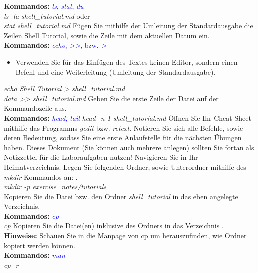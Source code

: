 \documentclass[paper=a4,fontsize=11pt]{scrartcl}%
\numberwithin{equation}{section}
\begin{document}
{\begin{enumerate}
\begin{tasks}
		\textbf{Kommandos:} \textcolor{blue}{\emph{ls}, \emph{stat}, \emph{du}}\\
		\textit{ls -la shell\_tutorial.md} oder\\
		\textit{stat shell\_tutorial.md}
		\task Fügen Sie mithilfe der Umleitung der Standardausgabe die Zeilen \glqq Shell Tutorial\grqq, sowie die Zeile mit dem aktuellen Datum ein.\\
		\textbf{Kommandos:} \textcolor{blue}{\emph{echo}, \emph{>>}, bzw. \emph{>}}\\
		\begin{itemize}
			\item \small Verwenden Sie für das Einfügen des Textes keinen Editor, sondern einen Befehl und eine Weiterleitung (Umleitung der Standardausgabe).
		\end{itemize}
		\textit{echo Shell Tutorial > shell\_tutorial.md}\\
		\textit{data >> shell\_tutorial.md}
		\task Geben Sie die erste Zeile der Datei auf der Kommandozeile aus.\\
		\textbf{Kommandos:} \textcolor{blue}{\emph{head}, \emph{tail}}
		\textit{head -n 1 shell\_tutorial.md}
		\task Öffnen Sie Ihr Cheat-Sheet mithilfe das Programms \emph{gedit} bzw. \emph{retext}. Notieren Sie sich alle Befehle, sowie deren Bedeutung, sodass Sie eine erste Anlaufstelle für die nächsten Übungen haben. Dieses Dokument (Sie können auch mehrere anlegen) sollten Sie fortan als Notizzettel für die Laboraufgaben nutzen!
		\task Navigieren Sie in Ihr Heimatverzeichnis. Legen Sie folgenden Ordner, sowie Unterordner mithilfe des \emph{mkdir}-Kommandos an: .\\
		\textit{mkdir -p exercise\_notes/tutorials}\\
		\task Kopieren Sie die Datei bzw. den Ordner \emph{shell\_tutorial} in das eben angelegte Verzeichnis.\\
		\textbf{Kommandos:} \textcolor{blue}{\emph{cp} }\\
		\textit{cp   }
        \task Kopieren Sie die Datei(en) inklusive des Ordners  in das Verzeichnis .\\
        \textbf{Hinweise:} Schauen Sie in die Manpage von cp um herauszufinden, wie Ordner kopiert werden können.\\
        \textbf{Kommandos:} \textcolor{blue}{\emph{man}}\\
        \textit{cp -r  }

\end{tasks}
\end{enumerate}}
\end{document}
